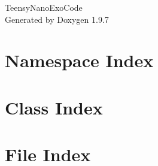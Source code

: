 \documentclass[twoside]{book}
\newcommand{\+}{\discretionary{\mbox{\scriptsize$\hookleftarrow$}}{}{}}
\newcommand{\clearemptydoublepage}{%
    \newpage{\pagestyle{empty}\cleardoublepage}%
  }
\begin{document}
  \raggedbottom
    \hypersetup{pageanchor=false,
                bookmarksnumbered=true,
                pdfencoding=unicode
               }
  \begin{titlepage}
  \vspace*{7cm}
  \begin{center}%
  {\Large Teensy\+Nano\+Exo\+Code}\\
  \vspace*{1cm}
  {\large Generated by Doxygen 1.9.7}\\
  \end{center}
  \end{titlepage}
  \clearemptydoublepage
  \tableofcontents
  \clearemptydoublepage
  \hypersetup{pageanchor=true}
\chapter{Namespace Index}

\chapter{Class Index}

\chapter{File Index}

\end{document}

